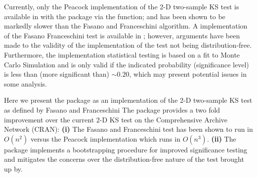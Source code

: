 \documentclass[codesnippet]{jss}
\newcommand{\fct}[1]{\code{#1()}}
\begin{document}
Currently, only the Peacock implementation of the 2-D two-sample KS test is available in  \citep{R} with the  package via the \fct{peacock2} function; and has been shown to be markedly slower than the Fasano and Franceschini algorithm\citep{Lopes2007}. A  implementation of the Fasano Franceschini test is available in \citep{numericalRecipes}; however, arguments have been made to the validity of the implementation of the test not being distribution-free\citep{Babu2006}. Furthermore, the  implementation statistical testing is based on a fit to Monte Carlo Simulation and is only valid if the indicated probability (significance level) is less than (more significant than) $\sim 0.20$, which may present potential issues in some analysis.

Here we present the  package as an  implementation of the 2-D two-sample KS test as defined by Fasano and Franceschini \citep{Fasano1987} The  package provides a two fold improvement over the current 2-D KS test on the Comprehensive  Archive Network (CRAN): \textbf{(i)} The Fasano and Franceschini test has been shown to run in $O(n^2)$ versus the Peacock implementation which runs in $O(n^3)$. \textbf{(ii)} The package implements a bootstrapping procedure for improved significance testing and mitigates the concerns over the distribution-free nature of the test brought up by\citep{Babu2006}.
\end{document}
